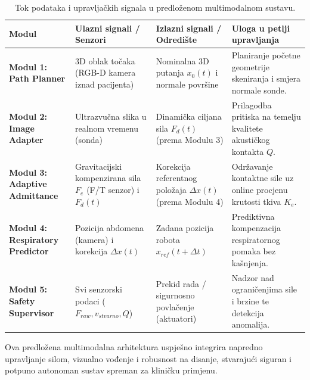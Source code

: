 \begin{table}[H]
\centering
\caption{Tok podataka i upravljačkih signala u predloženom multimodalnom sustavu.}
\label{tab:tok_podataka_arhitekture}
\begin{tabularx}{\textwidth}{p{} p{} p{} X}
\toprule
\textbf{Modul} & \textbf{Ulazni signali / Senzori} & \textbf{Izlazni signali / Odredište} & \textbf{Uloga u petlji upravljanja} \\
\midrule
\textbf{Modul 1: Path Planner} & 3D oblak točaka (RGB-D kamera iznad pacijenta) & Nominalna 3D putanja $x_0(t)$ i normale površine & Planiranje početne geometrije skeniranja i smjera normale sonde. \\
\textbf{Modul 2: Image Adapter} & Ultrazvučna slika u realnom vremenu (sonda) & Dinamička ciljana sila $F_d(t)$ (prema Modulu 3) & Prilagodba pritiska na temelju kvalitete akustičkog kontakta $Q$. \\
\textbf{Modul 3: Adaptive Admittance} & Gravitacijski kompenzirana sila $F_e$ (F/T senzor) i $F_d(t)$ & Korekcija referentnog položaja $\Delta x(t)$ (prema Modulu 4) & Održavanje kontaktne sile uz online procjenu krutosti tkiva $K_e$. \\
\textbf{Modul 4: Respiratory Predictor} & Pozicija abdomena (kamera) i korekcija $\Delta x(t)$ & Zadana pozicija robota $x_{ref}(t + \Delta t)$ & Prediktivna kompenzacija respiratornog pomaka bez kašnjenja. \\
\textbf{Modul 5: Safety Supervisor} & Svi senzorski podaci ($F_{raw}, v_{stvarno}, Q$) & Prekid rada / sigurnosno povlačenje (aktuatori) & Nadzor nad ograničenjima sile i brzine te detekcija anomalija. \\
\bottomrule
\end{tabularx}
\end{table}

Ova predložena multimodalna arhitektura uspješno integrira napredno upravljanje silom, vizualno vođenje i robusnost na disanje, stvarajući siguran i potpuno autonoman sustav spreman za kliničku primjenu.
